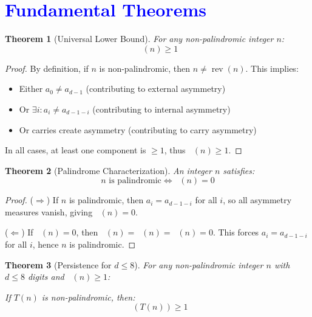 \documentclass[11pt,a4paper]{article}
\theoremstyle{plain}
\newtheorem{theorem}{Theorem}[section]
\theoremstyle{definition}
\DeclareMathOperator{\rev}{rev}
\DeclareMathOperator{\Aext}{A^{\text{(ext)}}}
\DeclareMathOperator{\Aint}{A^{\text{(int)}}}
\DeclareMathOperator{\Acarry}{A^{\text{(carry)}}}
\DeclareMathOperator{\Arobust}{A^{\text{(robust)}}}
\begin{document}
\section{\textcolor{blue}{Fundamental Theorems}}

\begin{theorem}[Universal Lower Bound]\label{thm:lower_bound}
For any non-palindromic integer $n$:
\begin{equation}
\Arobust(n) \geq 1
\end{equation}
\end{theorem}

\begin{proof}
By definition, if $n$ is non-palindromic, then $n \neq \rev(n)$. This implies:
\begin{itemize}
\item Either $a_0 \neq a_{d-1}$ (contributing to external asymmetry)
\item Or $\exists i : a_i \neq a_{d-1-i}$ (contributing to internal asymmetry)
\item Or carries create asymmetry (contributing to carry asymmetry)
\end{itemize}
In all cases, at least one component is $\geq 1$, thus $\Arobust(n) \geq 1$.
\end{proof}

\begin{theorem}[Palindrome Characterization]\label{thm:palindrome_char}
An integer $n$ satisfies:
\begin{equation}
n \text{ is palindromic} \iff \Arobust(n) = 0
\end{equation}
\end{theorem}

\begin{proof}
($\Rightarrow$) If $n$ is palindromic, then $a_i = a_{d-1-i}$ for all $i$, so all asymmetry measures vanish, giving $\Arobust(n) = 0$.

\noindent
($\Leftarrow$) If $\Arobust(n) = 0$, then $\Aext(n) = \Aint(n) = \Acarry(n) = 0$. This forces $a_i = a_{d-1-i}$ for all $i$, hence $n$ is palindromic.
\end{proof}

\begin{theorem}[Persistence for $d \leq 8$]\label{thm:persistence}
For any non-palindromic integer $n$ with $d \leq 8$ digits and $\Arobust(n) \geq 1$:

If $T(n)$ is non-palindromic, then:
\begin{equation}
\Arobust(T(n)) \geq 1
\end{equation}
\end{theorem}
\end{document}
